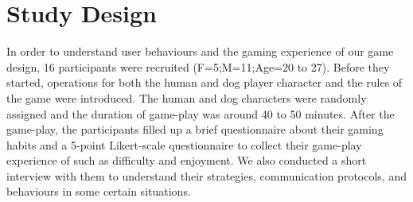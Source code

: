 \documentclass{sigchi}
\begin{document}
\section{Study Design}
In order to understand user behaviours and the gaming experience of our game design, 16 participants were recruited (F=5;M=11;Age=20 to 27).
Before they started, operations for both the human and dog player character and the rules of the game were introduced.
The human and dog characters were randomly assigned and the duration of game-play was around 40 to 50 minutes.
After the game-play, the participants filled up a brief questionnaire about their gaming habits and a 5-point Likert-scale questionnaire to collect their game-play experience of \getGameName{} such as difficulty and enjoyment. 
We also conducted a short interview with them to understand their strategies, communication protocols, and behaviours in some certain situations.
\end{document}
